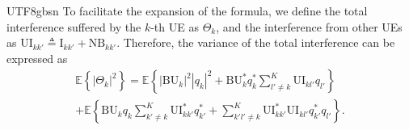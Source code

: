 \documentclass[lettersize,journal]{IEEEtran}
\begin{document}
\begin{CJK}{UTF8}{gbsn}
To facilitate the expansion of the formula, we define the total interference suffered by the $k$-th UE as $\Theta_k$, and the interference from other UEs as $\text{UI}_{kk'} \triangleq \text{I}_{kk'} + \text{NB}_{kk'}$. Therefore, the variance of the total interference can be expressed as 
\begin{align}\label{eqn-47}\mathbb{E } \left\{ {{{\left| \Theta_k  \right|}^2}} \right\} = \mathbb{E } \left\{ {{{\left| {\text{BU}_k} \right|}^2}{{\left| {{q_k}} \right|}^2} + \text{BU}_k^ * q_k^ * \sum _{l' \ne k}^K \text{UI}_{kl'}{q_{l'}}} \right\} \nonumber\\
+ \mathbb{E } \left\{ {\text{BU}_k{q_k}\sum_{k' \ne k}^K \text{UI}_{kk'}^ * q_{k'}^ *  + \sum_{k'l' \ne k}^K \text{UI}_{kk'}^ * \text{UI}_{kl'}q_{k'}^ * {q_{l'}}} \right\}.\end{align}


\end{CJK}
\end{document}
